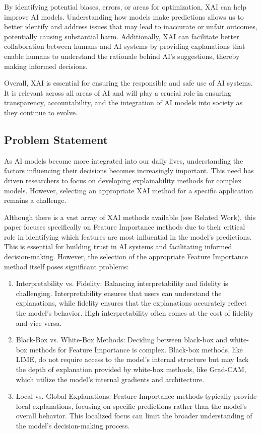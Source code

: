 \documentclass{article}
\begin{document}
By identifying potential biases, errors, or areas for optimization, XAI can help improve AI models. Understanding how models make predictions allows us to better identify and address issues that may lead to inaccurate or unfair outcomes, potentially causing substantial harm. Additionally, XAI can facilitate better collaboration between humans and AI systems by providing explanations that enable humans to understand the rationale behind AI’s suggestions, thereby making informed decisions.

Overall, XAI is essential for ensuring the responsible and safe use of AI systems. It is relevant across all areas of AI and will play a crucial role in ensuring transparency, accountability, and the integration of AI models into society as they continue to evolve.



\subsection{Problem Statement}
As AI models become more integrated into our daily lives, understanding the factors influencing their decisions becomes increasingly important. This need has driven researchers to focus on developing explainability methods for complex models. However, selecting an appropriate XAI method for a specific application remains a challenge.

Although there is a vast array of XAI methods available (see Related Work), this paper focuses specifically on Feature Importance methods due to their critical role in identifying which features are most influential in the model’s predictions. This is essential for building trust in AI systems and facilitating informed decision-making. However, the selection of the appropriate Feature Importance method itself poses significant problems:

\begin{enumerate}
    \item Interpretability vs. Fidelity:
    Balancing interpretability and fidelity is challenging. Interpretability ensures that users can understand the explanations, while fidelity ensures that the explanations accurately reflect the model’s behavior. High interpretability often comes at the cost of fidelity and vice versa.
    \item Black-Box vs. White-Box Methods:
    Deciding between black-box and white-box methods for Feature Importance is complex. Black-box methods, like LIME, do not require access to the model’s internal structure but may lack the depth of explanation provided by white-box methods, like Grad-CAM, which utilize the model’s internal gradients and architecture.
    \item Local vs. Global Explanations:
    Feature Importance methods typically provide local explanations, focusing on specific predictions rather than the model’s overall behavior. This localized focus can limit the broader understanding of the model’s decision-making process.
\end{enumerate}
\end{document}
